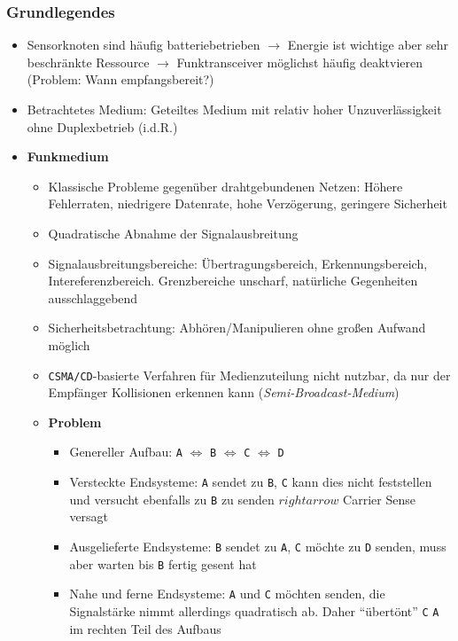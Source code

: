 \subsubsection{Grundlegendes}
\begin{itemize}
	\item Sensorknoten sind häufig batteriebetrieben \(\rightarrow\) Energie ist wichtige aber sehr beschränkte Ressource \(\rightarrow\) Funktransceiver möglichst häufig deaktvieren (Problem: Wann empfangsbereit?)
	\item Betrachtetes Medium: Geteiltes Medium mit relativ hoher Unzuverlässigkeit ohne Duplexbetrieb (i.d.R.)
	\item \textbf{Funkmedium}
	\begin{itemize}
		\item Klassische Probleme gegenüber drahtgebundenen Netzen: Höhere Fehlerraten, niedrigere Datenrate, hohe Verzögerung, geringere Sicherheit
		\item Quadratische Abnahme der Signalausbreitung
		\item Signalausbreitungsbereiche: Übertragungsbereich, Erkennungsbereich, Intereferenzbereich. Grenzbereiche unscharf, natürliche Gegenheiten ausschlaggebend
		\item Sicherheitsbetrachtung: Abhören/Manipulieren ohne großen Aufwand möglich
		\item \texttt{CSMA/CD}-basierte Verfahren für Medienzuteilung nicht nutzbar, da nur der Empfänger Kollisionen erkennen kann (\textit{Semi-Broadcast-Medium})
		\item \textbf{Problem}
		\begin{itemize}
			\item Genereller Aufbau: \texttt{A} \(\Leftrightarrow\) \texttt{B} \(\Leftrightarrow\) \texttt{C} \(\Leftrightarrow\) \texttt{D}
			\item Versteckte Endsysteme: \texttt{A} sendet zu \texttt{B}, \texttt{C} kann dies nicht feststellen und versucht ebenfalls zu \texttt{B} zu senden \(rightarrow\) Carrier Sense versagt
			\item Ausgelieferte Endsysteme: \texttt{B} sendet zu \texttt{A}, \texttt{C} möchte zu \texttt{D} senden, muss aber warten bis \texttt{B} fertig gesent hat
			\item Nahe und ferne Endsysteme: \texttt{A} und \texttt{C} möchten senden, die Signalstärke nimmt allerdings quadratisch ab. Daher "`übertönt"' \texttt{C} \texttt{A} im rechten Teil des Aufbaus
		\end{itemize}
	\end{itemize}

\end{itemize}
